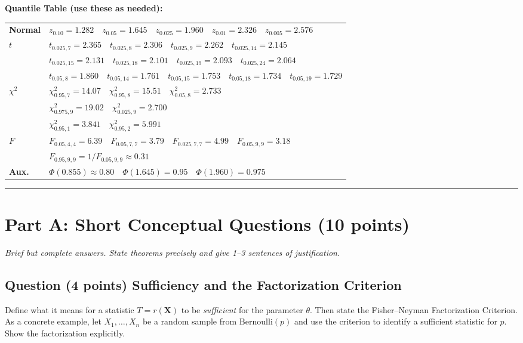 \documentclass[11pt]{article}
\newcounter{qnum}
\newcommand{\question}[2]{\stepcounter{qnum}\subsection*{Question \theqnum \quad (#1 points) \hfill #2}}
\begin{document}
\textbf{Quantile Table (use these as needed):}
\begin{center}\small
\begin{tabular}{ll}
\toprule
\textbf{Normal} & $z_{0.10}=1.282 \quad z_{0.05}=1.645 \quad z_{0.025}=1.960 \quad z_{0.01}=2.326 \quad z_{0.005}=2.576$ \\
\textbf{$t$} & $t_{0.025,7}=2.365 \quad t_{0.025,8}=2.306 \quad t_{0.025,9}=2.262 \quad t_{0.025,14}=2.145$ \\
            & $t_{0.025,15}=2.131 \quad t_{0.025,18}=2.101 \quad t_{0.025,19}=2.093 \quad t_{0.025,24}=2.064$ \\
            & $t_{0.05,8}=1.860 \quad t_{0.05,14}=1.761 \quad t_{0.05,15}=1.753 \quad t_{0.05,18}=1.734 \quad t_{0.05,19}=1.729$ \\
\textbf{$\chi^2$} & $\chi^2_{0.95,7}=14.07 \quad \chi^2_{0.95,8}=15.51 \quad \chi^2_{0.05,8}=2.733$ \\
                  & $\chi^2_{0.975,9}=19.02 \quad \chi^2_{0.025,9}=2.700$ \\
                  & $\chi^2_{0.95,1}=3.841 \quad \chi^2_{0.95,2}=5.991$ \\
\textbf{$F$} & $F_{0.05,4,4}=6.39 \quad F_{0.05,7,7}=3.79 \quad F_{0.025,7,7}=4.99 \quad F_{0.05,9,9}=3.18$ \\
             & $F_{0.95,9,9} = 1/F_{0.05,9,9} \approx 0.31$ \\
\textbf{Aux.} & $\Phi(0.855) \approx 0.80 \quad \Phi(1.645)=0.95 \quad \Phi(1.960)=0.975$ \\
\bottomrule
\end{tabular}
\end{center}

\bigskip
\hrule
\bigskip

\section*{Part A: Short Conceptual Questions \hfill (10 points)}

\textit{Brief but complete answers. State theorems precisely and give 1--3 sentences of justification.}

\question{4}{Sufficiency and the Factorization Criterion}
Define what it means for a statistic $T = r(\mathbf{X})$ to be \emph{sufficient} for the parameter $\theta$. Then state the Fisher--Neyman Factorization Criterion. As a concrete example, let $X_1,\ldots,X_n$ be a random sample from $\mathrm{Bernoulli}(p)$ and use the criterion to identify a sufficient statistic for $p$. Show the factorization explicitly.
\end{document}
